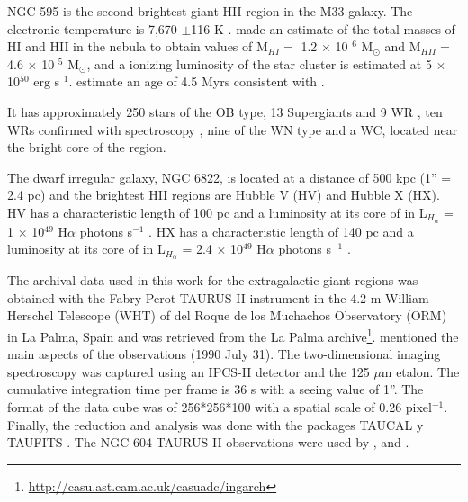 \documentclass[fleqn,usenatbib, useAMS, a4paper]{mnras}
\begin{document}
NGC 595 is the second brightest giant HII region in the M33 galaxy.
The electronic temperature is 7,670 $\pm$116 K \citep{2010MNRAS.402.1635R}.
\citet{1983A&A...119..185V} made an estimate of the total masses of HI and HII in the nebula to obtain values of M$_{HI}=$ 1.2 $\times$ 10 $^{6}$ M$_{\odot}$ and M$_{HII} =$ 4.6 $\times$ 10 $^{5}$ M$_{\odot}$, and a ionizing luminosity of the star cluster is estimated at 5 $\times$ 10$^{50}$ erg s $^{1}$.
\citet{1996AJ....111.1128M} estimate an age of 4.5 Myrs consistent with \citet{1993AJ....105.1400D}.

It has approximately 250 stars of the OB type, 13 Supergiants and 9 WR \citep{1996AJ....111.1128M}, ten WRs confirmed with spectroscopy \citet{1993AJ....105.1400D}, nine of the WN type and a WC, located near the bright core of the region.

The dwarf irregular galaxy, NGC 6822, is located at a distance of 500 kpc (1'' = 2.4 pc) \citep{1996AJ....112.1928G} and the brightest HII regions are Hubble V (HV) and Hubble X (HX).
HV has a characteristic length of 100 pc and a luminosity at its core of in L$_{H_\alpha}$ = 1 $\times$ 10$^{49}$ H$\alpha$ photons s$^{-1}$ \citep{1999PASP..111.1382O}.
HX has a characteristic length of 140 pc and a luminosity at its core of in L$_{H_\alpha}$ = 2.4 $\times$ 10$^{49}$ H$\alpha$ photons s$^{-1}$ \citep{1999PASP..111.1382O}.


The archival data used in this work for the extragalactic giant regions was obtained with the Fabry Perot TAURUS-II instrument in the 4.2-m William Herschel Telescope (WHT) of del Roque de los Muchachos Observatory (ORM) in La Palma, Spain and was retrieved from the La Palma archive\footnote{\url{http://casu.ast.cam.ac.uk/casuadc/ingarch}}.
\citet{sabalisck1995supersonic} mentioned the main aspects of the observations (1990 July 31).
The two-dimensional imaging spectroscopy was captured using an IPCS-II detector and the 125 $\mu$m etalon.
The cumulative integration time per frame is 36 s with a seeing value of 1''.
The format of the data cube was of 256*256*100 with a spatial scale of 0.26 pixel$^{-1}$.
Finally, the reduction and analysis was done with the packages TAUCAL y TAUFITS \citep{1992ASPC...25..445L}.
The NGC 604 TAURUS-II observations were used by \citet{sabalisck1995supersonic}, \citet{tanco1997} and \citet{2019arXiv191203543M}.
\end{document}
